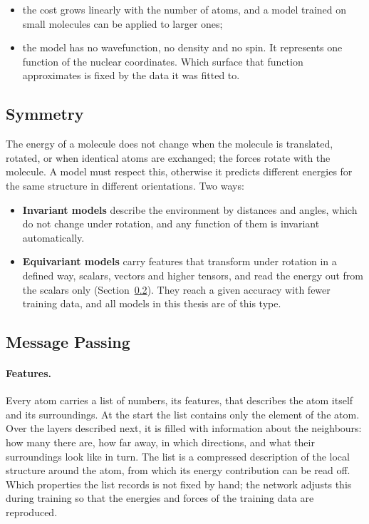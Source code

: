 \begin{itemize}
  \item the cost grows linearly with the number of atoms, and a model
    trained on small molecules can be applied to larger ones;
  \item the model has no wavefunction, no density and no spin.
    It represents one function of the nuclear coordinates. Which surface
    that function approximates is fixed by the data it was fitted to.
\end{itemize}

\subsection{Symmetry}
\label{sec:mlip-symmetry}

The energy of a molecule does not change when the molecule is translated,
rotated, or when identical atoms are exchanged; the forces rotate with the
molecule. A model must respect this, otherwise it predicts different
energies for the same structure in different orientations. Two ways:

\begin{itemize}
  \item \textbf{Invariant models} describe the environment by distances
    and angles, which do not change under rotation, and any function of
    them is invariant automatically.
  \item \textbf{Equivariant models} carry features that transform under
    rotation in a defined way, scalars, vectors and higher tensors, and
    read the energy out from the scalars only
    (Section~\ref{sec:mlip-mace}). They reach a given accuracy with fewer
    training data, and all models in this thesis are of this type.
\end{itemize}

\subsection{Message Passing}
\label{sec:mlip-mace}

\paragraph{Features.} Every atom carries a list of numbers, its features,
that describes the atom itself and its surroundings. At the start the
list contains only the element of the atom. Over the layers described
next, it is filled with information about the neighbours: how many there
are, how far away, in which directions, and what their surroundings look
like in turn. The list is a compressed description of the local structure
around the atom, from which its energy contribution can be read off.
Which properties the list records is not fixed by hand; the network
adjusts this during training so that the energies and forces of the
training data are reproduced.

